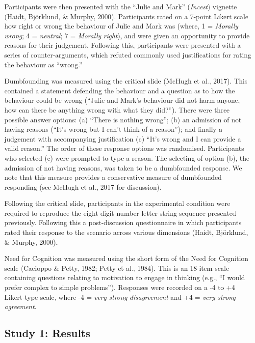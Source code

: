 \documentclass[
  american,
  man,floatsintext]{apa7}
\begin{document}
Participants were then presented with the ``Julie and Mark'' (\emph{Incest}) vignette (Haidt, Björklund, \& Murphy, 2000). Participants rated on a 7-point Likert scale how right or wrong the behaviour of Julie and Mark was (where, 1 = \emph{Morally wrong}; 4 = \emph{neutral}; 7 = \emph{Morally right}), and were given an opportunity to provide reasons for their judgement. Following this, participants were presented with a series of counter-arguments, which refuted commonly used justifications for rating the behaviour as ``wrong.''

Dumbfounding was measured using the critical slide (McHugh et al., 2017). This contained a statement defending the behaviour and a question as to how the behaviour could be wrong (``Julie and Mark's behaviour did not harm anyone, how can there be anything wrong with what they did?''). There were three possible answer options: (a) ``There is nothing wrong''; (b) an admission of not having reasons (``It's wrong but I can't think of a reason''); and finally a judgement with accompanying justification (c) ``It's wrong and I can provide a valid reason.'' The order of these response options was randomised. Participants who selected (c) were prompted to type a reason. The selecting of option (b), the admission of not having reasons, was taken to be a dumbfounded response. We note that this measure provides a conservative measure of dumbfounded responding (see McHugh et al., 2017 for discussion).

Following the critical slide, participants in the experimental condition were required to reproduce the eight digit number-letter string sequence presented previously. Following this a post-discussion questionnaire in which participants rated their response to the scenario across various dimensions (Haidt, Björklund, \& Murphy, 2000).

Need for Cognition was measured using the short form of the Need for Cognition scale (Cacioppo \& Petty, 1982; Petty et al., 1984). This is an 18 item scale containing questions relating to motivation to engage in thinking (e.g., ``I would prefer complex to simple problems''). Responses were recorded on a -4 to +4 Likert-type scale, where -4 = \emph{very strong disagreement} and +4 = \emph{very strong agreement}.

\hypertarget{study-1-results}{%
\subsection{Study 1: Results}\label{study-1-results}}
\end{document}
